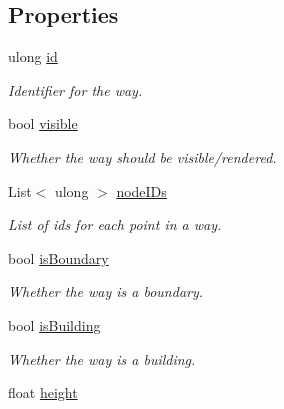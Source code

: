 \subsection*{Properties}
\begin{DoxyCompactItemize}
\item 
ulong \mbox{\hyperlink{class_osm_way_af6ebe7b51c51d19b7b0f384fefca77c6}{id}}
\begin{DoxyCompactList}\small\item\em Identifier for the way. \end{DoxyCompactList}\item 
bool \mbox{\hyperlink{class_osm_way_a53d64092eb3c266aca3b849519bf18b6}{visible}}
\begin{DoxyCompactList}\small\item\em Whether the way should be visible/rendered. \end{DoxyCompactList}\item 
List$<$ ulong $>$ \mbox{\hyperlink{class_osm_way_a39fae3a4cca779c2f96ebeb25cf98631}{node\+I\+Ds}}
\begin{DoxyCompactList}\small\item\em List of ids for each point in a way. \end{DoxyCompactList}\item 
bool \mbox{\hyperlink{class_osm_way_a9f13229c863318f4ad890552b685d677}{is\+Boundary}}
\begin{DoxyCompactList}\small\item\em Whether the way is a boundary. \end{DoxyCompactList}\item 
bool \mbox{\hyperlink{class_osm_way_ac30c4571e778d12b2ee9cfac0c2c4a03}{is\+Building}}
\begin{DoxyCompactList}\small\item\em Whether the way is a building. \end{DoxyCompactList}\item 
float \mbox{\hyperlink{class_osm_way_acd037b691fc5bfc5ad39802c369c6347}{height}}

\end{DoxyCompactItemize}
